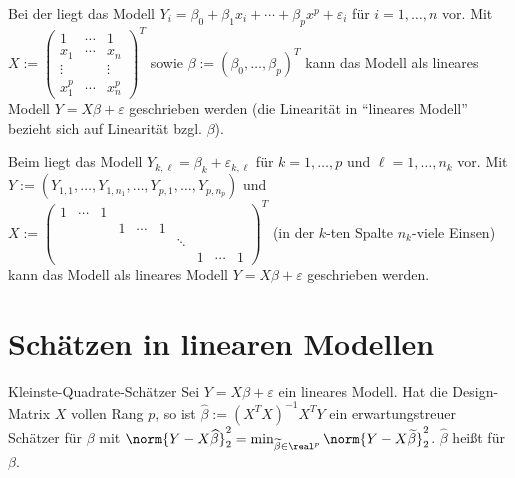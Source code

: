 \linie

\begin{Bsp}
    Bei der  liegt das Modell
    $Y_i = \beta_0 + \beta_1 x_i + \dotsb + \beta_p x^p + \varepsilon_i$
    für $i = 1, \dotsc, n$ vor.
    Mit $X := \begin{pmatrix}1 & \cdots & 1\\x_1 & \cdots & x_n\\\vdots && \vdots\\
    x_1^p & \dotsb & x_n^p\end{pmatrix}^T$
    sowie $\beta := (\beta_0, \dotsc, \beta_p)^T$
    kann das Modell als lineares Modell $Y = X\beta + \varepsilon$ geschrieben werden
    (die Linearität in "`lineares Modell"' bezieht sich auf Linearität bzgl. $\beta$).
\end{Bsp}

\linie
\pagebreak

\begin{Bsp}
    Beim  liegt das Modell
    $Y_{k,\ell} = \beta_k + \varepsilon_{k,\ell}$ für $k = 1, \dotsc, p$ und
    $\ell = 1, \dotsc, n_k$ vor.
    Mit $Y := (Y_{1,1}, \dotsc, Y_{1,n_1}, \dotsc, Y_{p,1}, \dotsc, Y_{p,n_p})$ und\\
    $X := \begin{pmatrix}1 & \cdots & 1 &&&&&&&\\&&& 1 & \cdots & 1
    &&&&\\&&&&&& \ddots &&&\\&&&&&&& 1 & \cdots & 1\end{pmatrix}^T$
    (in der $k$-ten Spalte $n_k$-viele Einsen)
    kann das Modell als lineares Modell $Y = X\beta + \varepsilon$ geschrieben werden.
\end{Bsp}

\section{%
    Schätzen in linearen Modellen%
}

\begin{Satz}{Kleinste-Quadrate-Schätzer}
    Sei $Y = X\beta + \varepsilon$ ein lineares Modell.
    Hat die Design-Matrix $X$ vollen Rang $p$, so ist
    $\widehat{\beta} := (X^T X)^{-1} X^T Y$
    ein erwartungstreuer Schätzer für $\beta$ mit
    $\norm{Y - X\widehat{\beta}}_2^2 = \min_{\widetilde{\beta} \in \real^p}
    \norm{Y - X\widetilde{\beta}}_2^2$.
    $\widehat{\beta}$ heißt  für $\beta$.
\end{Satz}

\pagebreak
